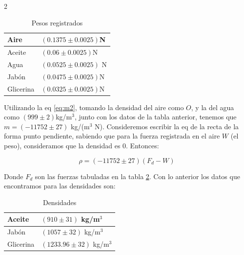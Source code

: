 \documentclass[10pt,letterpaper]{article}
\begin{document}
\begin{multicols}{2}
    \begin{table}[H] 
    \caption{\label{tab2} Pesos registrados} 
       \begin{center}
       \begin{tabular}{|p{2cm}|p{3cm}|}
       \hline
        Aire & $ (0.1375 \pm 0.0025)$N \\
       \hline
        Aceite & $(0.06 \pm 0.0025)$N \\
       \hline
        Agua & $(0.0525 \pm 0.0025)$ N\\
       \hline
        Jabón & $(0.0475 \pm 0.0025)$N \\
        \hline
        Glicerina & $(0.0325 \pm 0.0025)$N \\
        \hline
       \end{tabular}
       \end{center}
    \end{table}    

    Utilizando la eq \ref{eq:m2}, tomando la densidad del aire como $O$, y la del agua como $(999 \pm 2)$kg/m$^3$, junto con los datos de la tabla anterior, tenemos que $m = (-11752 \pm 27)$ kg/(m$^3$ N). Consideremos escribir la eq de la recta de la forma punto pendiente, sabiendo que para la fuerza registrada en el aire $W$ (el peso), consideramos que la densidad es 0. Entonces:

    \begin{equation}
        \label{lindin}
        \rho = (-11752 \pm 27) (F_d - W)
    \end{equation}

    Donde $F_d$ son las fuerzas tabuladas en la tabla \ref{tab2}. Con lo anterior los datos que encontramos para las densidades son:

    \begin{table}[H] 
    \caption{\label{tab2} Densidades} 
       \begin{center}
       \begin{tabular}{|p{1.8cm}|p{3.2cm}|}
       \hline
        Aceite & $(910 \pm 31)$ kg/m$^3$  \\
       \hline
        Jabón & $(1057 \pm 32)$ kg/m$^3$ \\
        \hline
        Glicerina & $(1233.96 \pm 32)$ kg/m$^3$ \\
        \hline
       \end{tabular}
       \end{center}
    \end{table} 



    

    \end{multicols}
\end{document}
